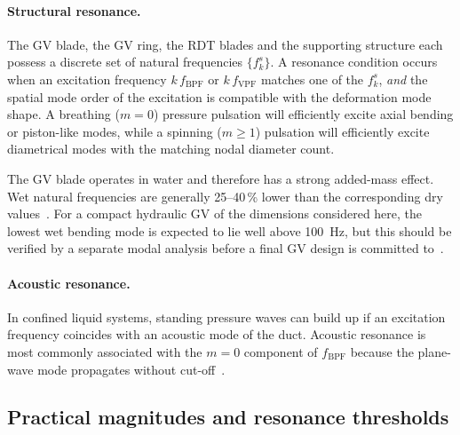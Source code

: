 \paragraph{Structural resonance.} The GV blade, the GV ring, the RDT blades and the supporting structure each possess a discrete set of natural frequencies $\{f_k^s\}$. A resonance condition occurs when an excitation frequency $k\,f_{\mathrm{BPF}}$ or $k\,f_{\mathrm{VPF}}$ matches one of the $f_k^s$, \emph{and} the spatial mode order of the excitation is compatible with the deformation mode shape. A breathing ($m=0$) pressure pulsation will efficiently excite axial bending or piston-like modes, while a spinning ($m\geq 1$) pulsation will efficiently excite diametrical modes with the matching nodal diameter count.
 
The GV blade operates in water and therefore has a strong added-mass effect. Wet natural frequencies are generally 25--40\,\% lower than the corresponding dry values~\cite{Tanaka2011}. For a compact hydraulic GV of the dimensions considered here, the lowest wet bending mode is expected to lie well above 100~Hz, but this should be verified by a separate modal analysis before a final GV design is committed to~\cite{Valentin2015}.
 
\paragraph{Acoustic resonance.} In confined liquid systems, standing pressure waves can build up if an excitation frequency coincides with an acoustic mode of the duct. Acoustic resonance is most commonly associated with the $m=0$ component of $f_{\mathrm{BPF}}$ because the plane-wave mode propagates without cut-off~\cite{Nicolet2007}.
 
\subsection{Practical magnitudes and resonance thresholds}
\label{sec:rsi-magnitudes}
 
